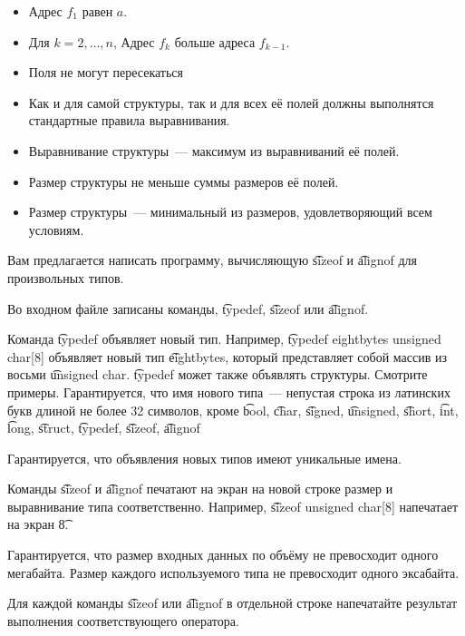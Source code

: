 \begin{itemize}
 \item Адрес $f_1$ равен $a$.
 \item Для $k = 2, \ldots, n$, Адрес $f_k$ больше адреса $f_{k-1}$.
 \item Поля не могут пересекаться
 \item
Как и для самой структуры, так и для всех её полей должны выполнятся стандартные правила выравнивания.
 \item Выравнивание структуры~--- максимум из выравниваний её полей.
 \item Размер структуры не меньше суммы размеров её полей.
 \item Размер структуры~--- минимальный из размеров, удовлетворяющий всем условиям.
\end{itemize}

Вам предлагается написать программу, вычисляющую \t{sizeof} и \t{alignof} для произвольных типов.

\InputFile

Во входном файле записаны команды, \t{typedef}, \t{sizeof} или \t{alignof}.

Команда \t{typedef} объявляет новый тип. Например, \t{typedef eightbytes unsigned char[8]} объявляет новый тип \t{eightbytes}, который представляет собой массив из восьми \t{unsigned char}. \t{typedef} может также объявлять структуры. Смотрите примеры.
Гарантируется, что имя нового типа~--- непустая строка из латинских букв длиной не более 32 символов, кроме
\t{bool}, \t{char}, \t{signed}, \t{unsigned}, \t{short}, \t{int}, \t{long}, \t{struct},
\t{typedef}, \t{sizeof}, \t{alignof}

Гарантируется, что объявления новых типов имеют уникальные имена.

Команды \t{sizeof} и \t{alignof} печатают на экран на новой строке размер и выравнивание типа соответственно. Например, \t{sizeof unsigned char[8]} напечатает на экран \t{8}.

Гарантируется, что размер входных данных по объёму не превосходит одного мегабайта. Размер каждого используемого типа не превосходит одного эксабайта.

\OutputFile

Для каждой команды \t{sizeof} или \t{alignof} в отдельной строке напечатайте результат выполнения соответствующего оператора.

\SAMPLES
